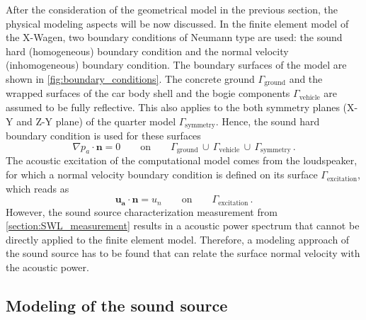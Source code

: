 {After the consideration of the geometrical model in the previous section, the physical modeling aspects will be now discussed. 
In the finite element model of the X-Wagen, two boundary conditions of Neumann type are used: the sound hard (homogeneous) boundary condition and the normal velocity (inhomogeneous) boundary condition. 
The boundary surfaces of the model are shown in \cref{fig:boundary_conditions}. The concrete ground $\Gamma_{\text{ground}}$ and the wrapped surfaces of the car body shell and the bogie components $\Gamma_{\text{vehicle}}$ are assumed to be fully reflective. 
This also applies to the both symmetry planes (X-Y and Z-Y plane) of the quarter model $\Gamma_{\text{symmetry}}$. Hence, the sound hard boundary condition is used for these surfaces
\begin{equation}
	\nabla p_a \cdot \boldsymbol{n} = 0\qquad\text{on}\qquad\Gamma_{\text{ground}}\,\cup\,\Gamma_{\text{vehicle}}\,\cup\,\Gamma_{\text{symmetry}}\,.
\end{equation}
The acoustic excitation of the computational model comes from the loudspeaker, for which a normal velocity boundary condition is defined on its surface $\Gamma_{\text{excitation}}$, which reads as
\begin{equation}
	\boldsymbol{u_a} \cdot \boldsymbol{n} = u_{n}\qquad\text{on}\qquad\Gamma_{\text{excitation}}\,.
\end{equation}
However, the sound source characterization measurement from \cref{section:SWL_measurement} results in a acoustic power spectrum that cannot be directly applied to the finite element model. Therefore, a modeling approach of the sound source has to be found that can relate the surface normal velocity with the acoustic power.

\subsection*{Modeling of the sound source}

}
